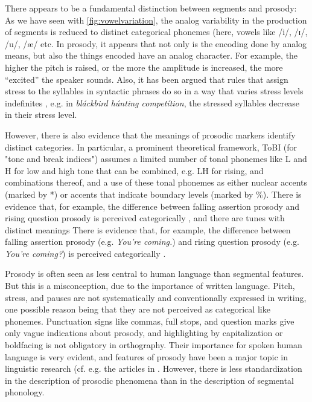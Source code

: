 There appears to be a fundamental distinction between segments and prosody: As we have seen with \ref{fig:vowelvariation}, the analog variability in the production of segments is reduced to distinct categorical phonemes (here, vowels like /i/, /ɪ/, /u/, /æ/ etc. In prosody, it appears that not only is the encoding done by analog means, but also the things encoded have an analog character. For example, the higher the pitch is raised, or the more the amplitude is increased, the more ``excited'' the speaker sounds. Also, it has been argued that rules that assign stress to the syllables in syntactic phrases do so in a way that varies stress levels indefinites \cite{ChomskyHalle}, e.g. in \textit{bláckbird húnting competítion}, the stressed syllables decrease in their stress level. 

However, there is also evidence that the meanings of prosodic markers identify distinct categories. In particular, a prominent theoretical framework, ToBI (for "tone and break indices") \cite{beckman2006tobi} assumes a limited number of tonal phonemes like L and H for low and high tone that can be combined, e.g. LH for rising, and combinations thereof, and a use of these tonal phonemes as either nuclear accents (marked by *) or accents that indicate boundary levels (marked by \%). There is evidence that, for example, the difference between falling assertion prosody and rising question prosody is perceived categorically \cite{liu2012categorical}, and there are tunes with distinct meanings \cite{Westera2020} There is evidence that, for example, the difference between falling assertion prosody (e.g. \textit{You're coming.}) and rising question prosody (e.g. \textit{You're coming?}) is perceived categorically \cite{liu2012categorical}.

Prosody is often seen as less central to human language than segmental features. But this is a misconception, due to the importance of written language. Pitch, stress, and pauses are not systematically and conventionally expressed in writing, one possible reason being that they are not perceived as categorical like phonemes. Punctuation signs like commas, full stops, and question marks give only vague indications about prosody, and highlighting by capitalization or boldfacing is not obligatory in orthography. Their importance for spoken human language is very evident, and features of prosody have been a major topic in linguistic research (cf. e.g. the articles in \cite{gussenhoven2021oxford}. However, there is less standardization in the description of prosodic phenomena than in the description of segmental phonology.

